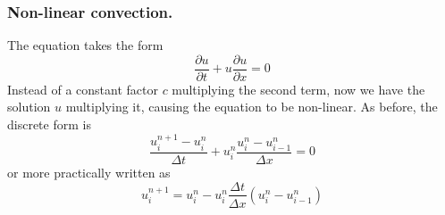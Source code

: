 \documentclass[../../../main.tex]{subfiles}
\begin{document}
\subsubsection{Non-linear convection.}
The equation takes the form
\begin{equation*}
    \frac{\partial u}{\partial t} + u \frac{\partial u}{\partial x} = 0
\end{equation*}
Instead of a constant factor $c$ multiplying the second term, now we have the solution $u$ multiplying it, causing the equation to be non-linear.
As before, the discrete form is
\begin{equation*}
    \frac{u_i^{n+1}-u_i^n}{\Delta t} + u_i^n \frac{u_i^n-u_{i-1}^n}{\Delta x} = 0
\end{equation*}
or more practically written as
\begin{equation*}
    u_i^{n+1} = u_i^n - u_i^n \frac{\Delta t}{\Delta x} (u_i^n - u_{i-1}^n)
\end{equation*}
\end{document}
